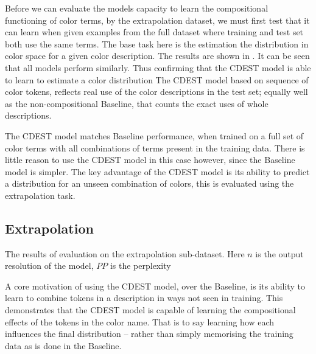 \documentclass[11pt,letterpaper]{article}
\begin{document}
Before we can evaluate the models capacity to learn the compositional functioning of color terms, by the extrapolation dataset, we must first test that it can learn when given examples from the full dataset where training and test set both use the same terms.
The base task here is the estimation the distribution in color space for a given color description.
The results are shown in .
It can be seen that all models perform similarly.
Thus confirming that the CDEST model is able to learn to estimate a color distribution
The CDEST model based on sequence of color tokens,
reflects real use of the color descriptions in the test set; 
equally well as the non-compositional Baseline, that counts the exact uses of whole descriptions.

The CDEST model matches Baseline performance, when trained on a full set of color terms with all combinations of terms present in the training data.
There is little reason to use the CDEST model in this case however, since the Baseline model is simpler.
The key advantage of the CDEST model is its ability to predict a distribution for an unseen combination of colors, this is evaluated using the extrapolation task.

\subsection{Extrapolation}

\begin{table}
	\centering
	\caption{\label{tblresextrapo} The results of evaluation on the extrapolation sub-dataset. Here $n$ is the output resolution of the model, $PP$ is the perplexity}
\end{table}


A core motivation of using the CDEST model, over the Baseline, is its ability to learn to combine tokens in a description in ways not seen in training.
This demonstrates that the CDEST model is capable of learning the compositional effects of the tokens in the color name.
That is to say learning how each influences the final distribution -- rather than simply memorising the training data as is done in the Baseline.
\end{document}
